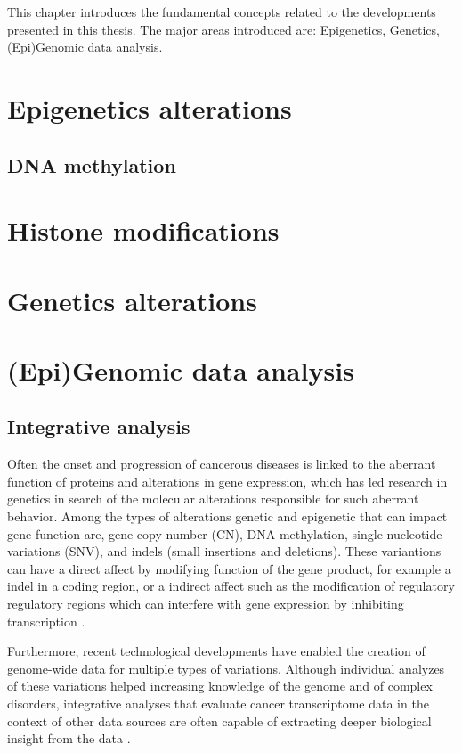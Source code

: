 This chapter introduces the fundamental concepts related to the developments presented in this thesis. The major areas introduced are: Epigenetics, Genetics, (Epi)Genomic data analysis.


\section{Epigenetics alterations}
\subsection{DNA methylation}
\section{Histone modifications}

\section{Genetics alterations}


\section{(Epi)Genomic data analysis}

\subsection{Integrative analysis}
Often the onset and progression of cancerous diseases is linked to the aberrant function of proteins and alterations in gene expression, which has led research in genetics in search of the molecular alterations responsible for such aberrant behavior.
Among the types of alterations genetic and epigenetic
that can impact gene function are, gene copy number
(CN), DNA methylation, single nucleotide variations (SNV), and indels (small insertions and
deletions).
These variantions can have a direct affect by modifying
 function of the gene product, for example a
indel in a coding region, or a indirect affect such as
the modification of regulatory regulatory regions
 which can interfere
 with gene expression by inhibiting transcription \cite{thingholm2016strategies}.

Furthermore, recent technological developments have enabled the creation of genome-wide data for multiple types of variations.
Although individual analyzes of these variations helped  increasing knowledge of the genome and of complex
disorders, integrative analyses that evaluate cancer transcriptome data in the context of other data sources are often capable of extracting deeper biological insight from the data \cite{rhodes2005integrative}.

